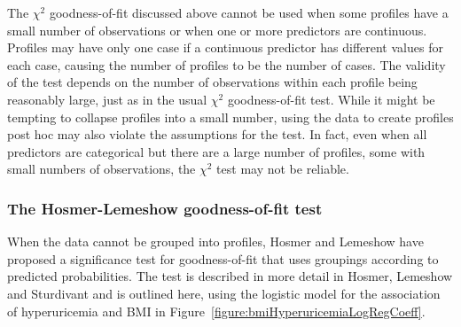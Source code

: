 The $\chi^2$ goodness-of-fit discussed above cannot be used when some profiles have a small number of observations or when one or more predictors are continuous.  Profiles may have only one case if a continuous predictor has different values for each case, causing the number of profiles to be the number of cases.  The validity of the test depends on the number of observations within each profile being reasonably large, just as in the usual $\chi^2$ goodness-of-fit test.  While it might be tempting to collapse profiles into a small number, using the data to create profiles post hoc may also violate the assumptions for the test.  In fact, even when all predictors are categorical but there are a large number of profiles, some with small numbers of observations, the $\chi^2$ test may not be reliable.

\subsubsection{The Hosmer-Lemeshow goodness-of-fit test}

 When the data cannot be grouped into profiles, Hosmer and Lemeshow have proposed a significance test for goodness-of-fit that uses groupings according to predicted probabilities.   The test is described in more detail in Hosmer, Lemeshow and Sturdivant and is outlined here, using the logistic model for the association of hyperuricemia and BMI in Figure~\ref{figure:bmiHyperuricemiaLogRegCoeff}.


